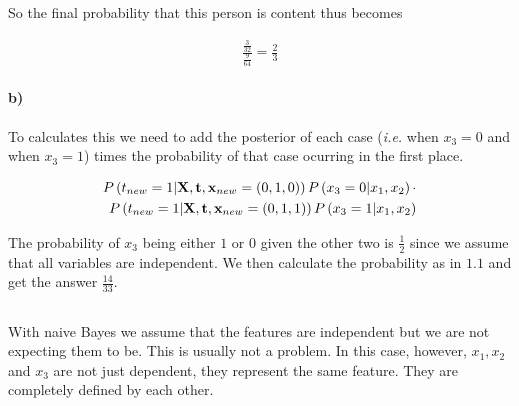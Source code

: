 \documentclass{article}
\begin{document}
So the final probability that this person is content thus becomes

\begin{align}
  \frac{\frac{3}{32}}{\frac{9}{64}} = \frac{2}{3}
\end{align}

\paragraph{b)}

To calculates this we need to add the posterior of each case (\emph{i.e.} when
$x_3 = 0$ and when $x_3 = 1$) times the probability of that case ocurring in
the first place.

\begin{align}
  P\left( t_{new} = 1 \vert \mathbf{X}, \mathbf{t}, \mathbf{x}_{new} = (0, 1, 0) \right) P \left( x_3 = 0  \vert x_1, x_2 \right) \cdot \\
  \notag P\left( t_{new} = 1 \vert \mathbf{X}, \mathbf{t}, \mathbf{x}_{new} = (0, 1, 1) \right) P \left( x_3 = 1  \vert x_1, x_2 \right)
\end{align}

The probability of $x_3$ being either $1$ or $0$ given the other two is
$\frac{1}{2}$ since we assume that all variables are independent. We then calculate the probability as in $1.1$ and get the answer $\frac{14}{33}$.

%
%
%

\subsection{}

With naive Bayes we assume that the features are independent but we are not
expecting them to be. This is usually not a problem. In this case, however,
$x_1, x_2$ and $x_3$ are not just dependent, they represent the same feature.
They are completely defined by each other.
\end{document}
